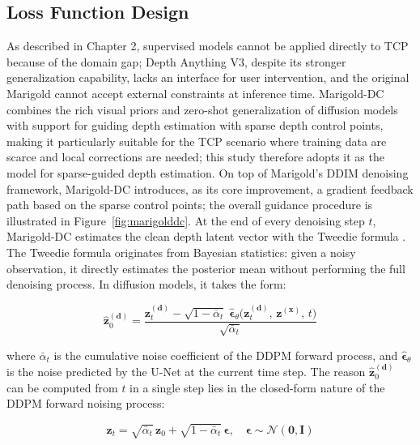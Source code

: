 \subsection{Loss Function Design}
\label{subsec:loss}

As described in Chapter 2, supervised models cannot be applied directly to TCP because of the domain gap;
Depth Anything V3, despite its stronger generalization capability, lacks an interface for user intervention,
and the original Marigold cannot accept external constraints at inference time.
Marigold-DC \cite{marigolddc} combines the rich visual priors and zero-shot generalization of diffusion models
with support for guiding depth estimation with sparse depth control points,
making it particularly suitable for the TCP scenario where training data are scarce and local corrections are needed;
this study therefore adopts it as the model for sparse-guided depth estimation.
On top of Marigold's DDIM denoising framework,
Marigold-DC introduces, as its core improvement, a gradient feedback path based on the sparse control points;
the overall guidance procedure is illustrated in Figure~\ref{fig:marigolddc}.
At the end of every denoising step $t$,
Marigold-DC estimates the clean depth latent vector with the Tweedie formula \cite{tweedie}.
The Tweedie formula originates from Bayesian statistics: given a noisy observation,
it directly estimates the posterior mean without performing the full denoising process.
In diffusion models, it takes the form:

\begin{equation}
  \hat{\mathbf{z}}_0^{(\mathbf{d})} =
    \frac{
      \mathbf{z}_t^{(\mathbf{d})} -
      \sqrt{1 - \bar{\alpha}_t}\;
      \hat{\boldsymbol{\epsilon}}_\theta\!\bigl(
        \mathbf{z}_t^{(\mathbf{d})},\, \mathbf{z}^{(\mathbf{x})},\, t
      \bigr)
    }{\sqrt{\bar{\alpha}_t}}
  \label{eq:tweedie}
\end{equation}

where $\bar{\alpha}_t$ is the cumulative noise coefficient of the DDPM forward process,
and $\hat{\boldsymbol{\epsilon}}_\theta$ is the noise predicted by the U-Net at the current time step.
The reason $\hat{\mathbf{z}}_0^{(\mathbf{d})}$ can be computed from $t$ in a single step
lies in the closed-form nature of the DDPM forward noising process:

\begin{equation}
  \mathbf{z}_t = \sqrt{\bar{\alpha}_t}\,\mathbf{z}_0 + \sqrt{1 - \bar{\alpha}_t}\,\boldsymbol{\epsilon},
  \quad \boldsymbol{\epsilon} \sim \mathcal{N}(\mathbf{0}, \mathbf{I})
\end{equation}

